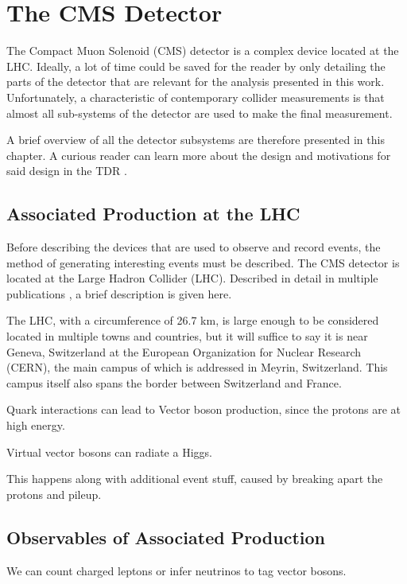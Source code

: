 \chapter{The CMS Detector} \label{ch:detector}

The Compact Muon Solenoid (CMS) detector is a complex device located at the LHC.
Ideally, a lot of time could be saved for the reader by only detailing the parts of the detector that are relevant for the analysis presented in this work.
Unfortunately, a characteristic of contemporary collider measurements is that almost all sub-systems of the detector are used to make the final measurement.

A brief overview of all the detector subsystems are therefore presented in this chapter.
A curious reader can learn more about the design and motivations for said design in the TDR \cite{cms-tdr}.


\section{Associated Production at the LHC}

Before describing the devices that are used to observe and record events,
the method of generating interesting events must be described.
The CMS detector is located at the Large Hadron Collider (LHC).
Described in detail in multiple publications \cite{Evans_2008},
a brief description is given here.

The LHC, with a circumference of 26.7 km, is large enough to be considered located in multiple towns and countries,
but it will suffice to say it is near Geneva, Switzerland at the European Organization for Nuclear Research (CERN), the main campus of which is addressed in Meyrin, Switzerland.
This campus itself also spans the border between Switzerland and France.

Quark interactions can lead to Vector boson production,
since the protons are at high energy.

Virtual vector bosons can radiate a Higgs.

This happens along with additional event stuff,
caused by breaking apart the protons and pileup.

\section{Observables of Associated Production}

We can count charged leptons or infer neutrinos to tag vector bosons.

